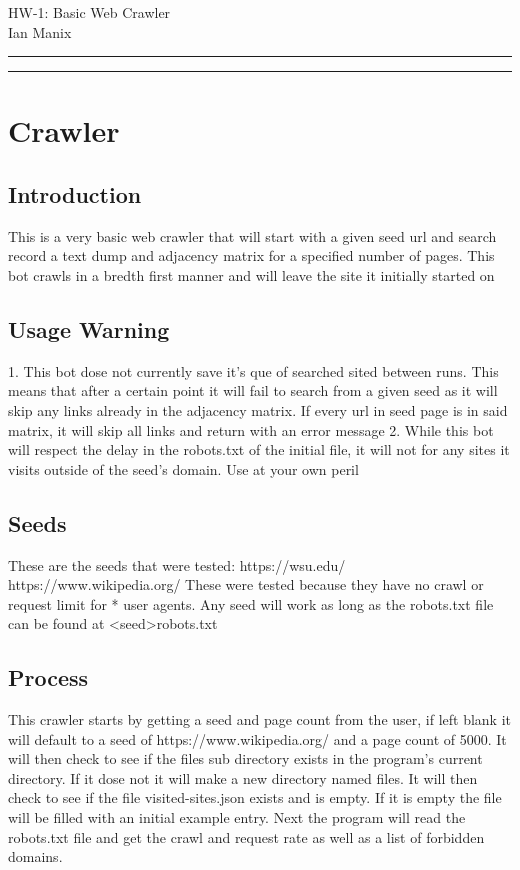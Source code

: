 \documentclass[12pt, letterpaper]{article}
\begin{document}
	\begin{center}
		\huge{HW-1: Basic Web Crawler}\\[10pt]
		\large{Ian Manix}
	\end{center}
\rule{\textwidth}{0.5pt}

\rule{\textwidth}{0.5pt}

\section{Crawler}
\subsection{Introduction}

This is a very basic web crawler that  will start with a given seed url and search record a text dump and adjacency matrix for a specified number of pages. This bot crawls in a bredth first manner and will leave the site it initially started on

\subsection{Usage Warning}
1. This bot dose not currently save it's que of searched sited between runs. This means that after a certain point it will fail to search from a given seed as it will skip any links already in the adjacency matrix. If every url in seed page is in said matrix, it will skip all links and return with an error message
2. While this bot will respect the delay in the robots.txt of the initial file, it will not for any sites it visits outside of the seed's domain. Use at your own peril

\subsection{Seeds}
These are the seeds that were tested:
https://wsu.edu/
https://www.wikipedia.org/
These were tested because they have no crawl or request limit for * user agents. Any seed will work as long as the robots.txt file can be found at <seed>robots.txt

\subsection{Process}
This crawler starts by getting a seed and page count from the user, if left blank it will default to a seed of https://www.wikipedia.org/ and a page count of 5000. It will then check to see if the files sub directory exists in the program's current directory. If it dose not it will make a new directory named files. It will then check to see if the file visited-sites.json exists and is empty. If it is empty the file will be filled with an initial example entry. Next the program will read the robots.txt file and get the crawl and request rate as well as a list of forbidden domains. 
\end{document}
